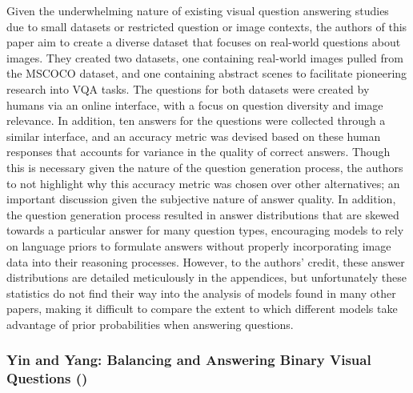 Given the underwhelming nature of existing visual question answering studies due to small datasets or restricted question or image contexts, the authors of this paper aim to create a diverse dataset that focuses on real-world questions about images. They created two datasets, one containing real-world images pulled from the MSCOCO dataset, and one containing abstract scenes to facilitate pioneering research into VQA tasks. The questions for both datasets were created by humans via an online interface, with a focus on question diversity and image relevance. In addition, ten answers for the questions were collected through a similar interface, and an accuracy metric was devised based on these human responses that accounts for variance in the quality of correct answers. Though this is necessary given the nature of the question generation process, the authors to not highlight why this accuracy metric was chosen over other alternatives; an important discussion given the subjective nature of answer quality. In addition, the question generation process resulted in answer distributions that are skewed towards a particular answer for many question types, encouraging models to rely on language priors to formulate answers without properly incorporating image data into their reasoning processes. However, to the authors' credit, these answer distributions are detailed meticulously in the appendices, but unfortunately these statistics do not find their way into the analysis of models found in many other papers, making it difficult to compare the extent to which different models take advantage of prior probabilities when answering questions.


\subsubsection*{Yin and Yang: Balancing and Answering Binary Visual Questions (\cite{zhang2016yin})}

